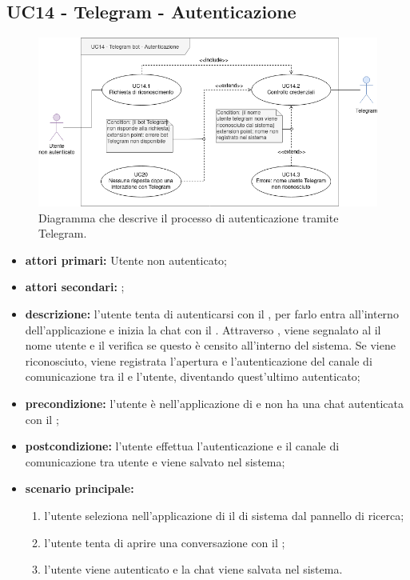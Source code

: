 \subsection{UC14 - Telegram - Autenticazione}
		
	\begin{figure}[H]
		\centering
		\includegraphics[scale=0.60]{res/images/uc14}
		\caption{Diagramma che descrive il processo di autenticazione tramite Telegram.}
	\end{figure}
		
	\begin{itemize}
		\item \textbf{attori primari:} Utente non autenticato;
		\item \textbf{attori secondari:} ;
		\item \textbf{descrizione:} l'utente tenta di autenticarsi con il  , per farlo entra all'interno dell'applicazione e inizia la chat con il . Attraverso , viene segnalato al  il nome utente e il  verifica se questo è censito all'interno del sistema. Se viene riconosciuto, viene registrata l'apertura e l'autenticazione del canale di comunicazione tra il  e l'utente, diventando quest'ultimo autenticato; 
		\item \textbf{precondizione:} l'utente è nell'applicazione di  e non ha una chat autenticata con il ;
		\item \textbf{postcondizione:} l'utente effettua l'autenticazione e il canale di comunicazione tra utente e  viene salvato nel sistema;
		\item \textbf{scenario principale:}
		\begin{enumerate}
			\item l'utente seleziona nell'applicazione di  il  di sistema dal pannello di ricerca;
			\item l'utente tenta di aprire una conversazione con il ;
			\item l'utente viene autenticato e la chat viene salvata nel sistema.
		\end{enumerate}
	\end{itemize}
	
